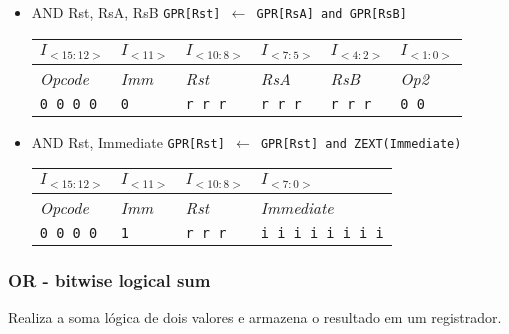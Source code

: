 \documentclass{extreport}
\begin{document}
\begin{itemize}
\item AND Rst, RsA, RsB
\subitem \texttt{GPR[Rst] $\leftarrow$ GPR[RsA] and GPR[RsB]}
\begin{table}[ht!]
\centering
\begin{tabular}{|p{1.6cm}|p{1.6cm}|p{1.6cm}|p{1.6cm}|p{1.6cm}|p{1.6cm}|}
\hline
$I_{<15:12>}$ & $I_{<11>}$ & $I_{<10:8>}$ & $I_{<7:5>}$ & $I_{<4:2>}$ & $I_{<1:0>}$ \\ \hline
\textit{Opcode} & \textit{Imm} & \textit{Rst} & \textit{RsA} & \textit{RsB} & \textit{Op2} \\ \hline
\texttt{0 0 0 0} & \texttt{0} & \texttt{r r r} & \texttt{r r r} & \texttt{r r r} & \texttt{0 0} \\ \hline
\end{tabular}
\end{table}

\item AND Rst, Immediate
\subitem \texttt{GPR[Rst] $\leftarrow$ GPR[Rst] and ZEXT(Immediate)}
\begin{table}[ht!]
\centering
\begin{tabular}{|p{1.6cm}|p{1.6cm}|p{1.6cm}|p{5.65cm}|}
\hline
$I_{<15:12>}$ & $I_{<11>}$ & $I_{<10:8>}$ & $I_{<7:0>}$ \\ \hline
\textit{Opcode} & \textit{Imm} & \textit{Rst} & \textit{Immediate} \\ \hline
\texttt{0 0 0 0} & \texttt{1} & \texttt{r r r} & \texttt{i i i i i i i i} \\ \hline
\end{tabular}
\end{table}
\end{itemize}

\subsubsection{OR - bitwise logical sum}
Realiza a soma lógica de dois valores e armazena o resultado em um registrador.
\end{document}
